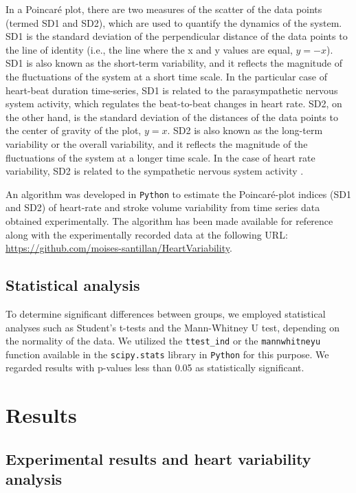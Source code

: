 \documentclass[%
preprint,
 amsmath,amssymb,
 aps,
]{revtex4-2}
\begin{document}
In a Poincaré plot, there are two measures of the scatter of the data points (termed SD1 and SD2), which are used to quantify the dynamics of the system. SD1 is the standard deviation of the perpendicular distance of the data points to the line of identity (i.e., the line where the x and y values are equal, $y = -x$). SD1 is also known as the short-term variability, and it reflects the magnitude of the fluctuations of the system at a short time scale. In the particular case of heart-beat duration time-series, SD1 is related to the parasympathetic nervous system activity, which regulates the beat-to-beat changes in heart rate. SD2, on the other hand, is the standard deviation of the distances of the data points to the center of gravity of the plot, $y = x$. SD2 is also known as the long-term variability or the overall variability, and it reflects the magnitude of the fluctuations of the system at a longer time scale. In the case of heart rate variability, SD2 is related to the sympathetic nervous system activity \citep{Zimatore_2022}.

An algorithm was developed in \texttt{Python} to estimate the Poincaré-plot indices (SD1 and SD2) of heart-rate and stroke volume variability from time series data obtained experimentally. The algorithm has been made available for reference along with the experimentally recorded data at the following URL: \url{https://github.com/moises-santillan/HeartVariability}.

\subsection{Statistical analysis}

To determine significant differences between groups, we employed statistical analyses such as Student's t-tests and the Mann-Whitney U test, depending on the normality of the data. We utilized the \texttt{ttest\_ind} or the \texttt{mannwhitneyu} function available in the \texttt{scipy.stats} library in \texttt{Python} for this purpose. We regarded results with p-values less than 0.05 as statistically significant.

\section{\label{sec:res}Results}

\subsection{\label{sec:conclu}Experimental results and heart variability analysis}
\end{document}
